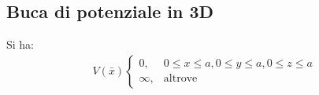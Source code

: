 \subsection{Buca di potenziale in 3D}
\begin{esempio}[Griffiths]
Si ha:
\begin{equation}\begin{split}
V\left(\bar x\right)
\begin{cases}
0, & 0\le x \le a, 0\le y \le a, 0\le z\le a\\
\infty , & \textrm{altrove}
\end{cases}
\end{split}\end{equation}
\end{esempio}